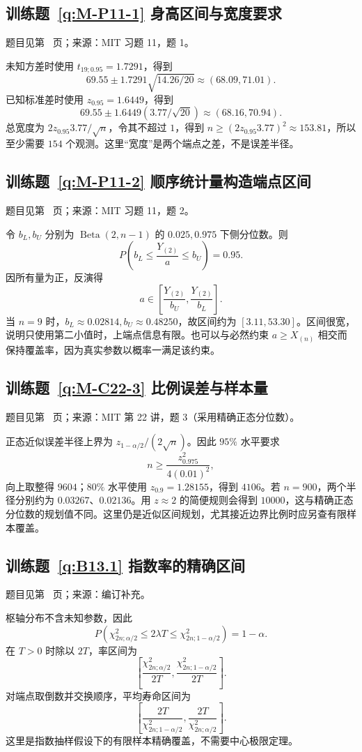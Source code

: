 \subsection*{训练题~\ref{q:M-P11-1} 身高区间与宽度要求}\label{a:M-P11-1}{\small 题目见第~\pageref{q:M-P11-1} 页；来源：MIT 习题 11，题 1。}
\begin{solve}未知方差时使用 $t_{19;0.95}=1.7291$，得到\[69.55\pm1.7291\sqrt{14.26/20}\approx(68.09,71.01).\]已知标准差时使用 $z_{0.95}=1.6449$，得到\[69.55\pm1.6449(3.77/\sqrt{20})\approx(68.16,70.94).\]总宽度为 $2z_{0.95}3.77/\sqrt n$，令其不超过 $1$，得到 $n\ge(2z_{0.95}3.77)^2\approx153.81$，所以至少需要 $154$ 个观测。这里“宽度”是两个端点之差，不是误差半径。\end{solve}

\subsection*{训练题~\ref{q:M-P11-2} 顺序统计量构造端点区间}\label{a:M-P11-2}{\small 题目见第~\pageref{q:M-P11-2} 页；来源：MIT 习题 11，题 2。}
\begin{solve}令 $b_L,b_U$ 分别为 $\operatorname{Beta}(2,n-1)$ 的 $0.025,0.975$ 下侧分位数。则\[P\left(b_L\le\frac{Y_{(2)}}a\le b_U\right)=0.95.\]因所有量为正，反演得\[a\in\left[\frac{Y_{(2)}}{b_U},\frac{Y_{(2)}}{b_L}\right].\]当 $n=9$ 时，$b_L\approx0.02814,b_U\approx0.48250$，故区间约为 $[3.11,53.30]$。区间很宽，说明只使用第二小值时，上端点信息有限。也可以与必然约束 $a\ge X_{(n)}$ 相交而保持覆盖率，因为真实参数以概率一满足该约束。\end{solve}

\subsection*{训练题~\ref{q:M-C22-3} 比例误差与样本量}\label{a:M-C22-3}{\small 题目见第~\pageref{q:M-C22-3} 页；来源：MIT 第 22 讲，题 3（采用精确正态分位数）。}
\begin{solve}正态近似误差半径上界为 $z_{1-\alpha/2}/(2\sqrt n)$。因此 $95\%$ 水平要求\[n\ge\frac{z_{0.975}^2}{4(0.01)^2},\]向上取整得 $9604$；$80\%$ 水平使用 $z_{0.9}=1.28155$，得到 $4106$。若 $n=900$，两个半径分别约为 $0.03267$、$0.02136$。用 $z\approx2$ 的简便规则会得到 $10000$，这与精确正态分位数的规划值不同。这里仍是近似区间规划，尤其接近边界比例时应另查有限样本覆盖。\end{solve}

\subsection*{训练题~\ref{q:B13.1} 指数率的精确区间}\label{a:B13.1}{\small 题目见第~\pageref{q:B13.1} 页；来源：编订补充。}
\begin{solve}枢轴分布不含未知参数，因此\[P\left(\chi^2_{2n;\alpha/2}\le2\lambda T\le\chi^2_{2n;1-\alpha/2}\right)=1-\alpha.\]在 $T>0$ 时除以 $2T$，率区间为\[\left[\frac{\chi^2_{2n;\alpha/2}}{2T},\frac{\chi^2_{2n;1-\alpha/2}}{2T}\right].\]对端点取倒数并交换顺序，平均寿命区间为\[\left[\frac{2T}{\chi^2_{2n;1-\alpha/2}},\frac{2T}{\chi^2_{2n;\alpha/2}}\right].\]这里是指数抽样假设下的有限样本精确覆盖，不需要中心极限定理。\end{solve}

